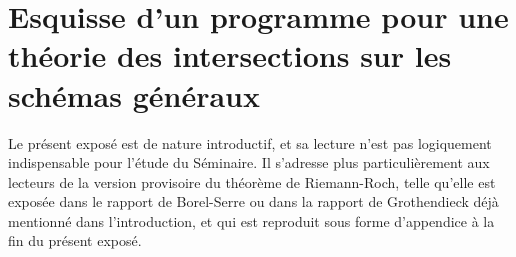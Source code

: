 
\addtocounter{chapter}{-1}
\chapter{Esquisse d'un programme pour une théorie des intersections sur les schémas généraux}\label{sec:0}





Le présent exposé est de nature introductif, et sa lecture n'est pas logiquement indispensable pour l'étude du Séminaire. Il s'adresse plus particulièrement aux lecteurs de la version provisoire du théorème de Riemann-Roch, telle qu'elle est exposée dans le rapport de Borel-Serre \cite{bs58} ou dans la rapport de Grothendieck déjà mentionné dans l'introduction, et qui est reproduit sous forme d'appendice à la fin du présent exposé. 





\section{}

